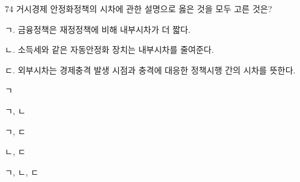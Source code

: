 \begin{question}{74}
거시경제 안정화정책의 시차에 관한 설명으로 옳은 것을 모두 고른 것은?
\begin{framedtext}
ㄱ. 금융정책은 재정정책에 비해 내부시차가 더 짧다. \par
ㄴ. 소득세와 같은 자동안정화 장치는 내부시차를 줄여준다. \par
ㄷ. 외부시차는 경제충격 발생 시점과 충격에 대응한 정책시행 간의 시차를 뜻한다. \par
\end{framedtext}
\begin{choices}
  \item ㄱ
  \item ㄱ, ㄴ
  \item ㄱ, ㄷ
  \item ㄴ, ㄷ
  \item ㄱ, ㄴ, ㄷ
\end{choices}
\end{question}
